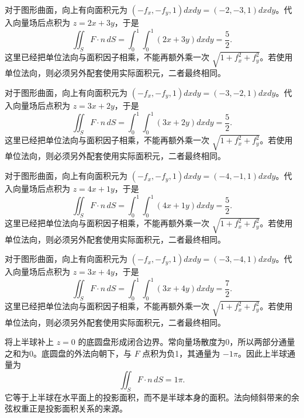 \documentclass[12pt,fontset=fandol]{ctexart}
\begin{document}
\begin{solve}\label{ans:c42q9}
对于图形曲面，向上有向面积元为 $(-f_x,-f_y,1)dxdy=(-2,-3,1)dxdy$。代入向量场后点积为 $z=2x+3y$，于是
\[
\iint_SF\cdot n\,dS=\int_0^1\int_0^1(2x+3y)dxdy=\frac{5}{2}.
\]
这里已经把单位法向与面积因子相乘，不能再额外乘一次 $\sqrt{1+f_x^2+f_y^2}$。若使用单位法向，则必须另外配套使用实际面积元，二者最终相同。
\end{solve}

\begin{solve}\label{ans:c42q10}
对于图形曲面，向上有向面积元为 $(-f_x,-f_y,1)dxdy=(-3,-2,1)dxdy$。代入向量场后点积为 $z=3x+2y$，于是
\[
\iint_SF\cdot n\,dS=\int_0^1\int_0^1(3x+2y)dxdy=\frac{5}{2}.
\]
这里已经把单位法向与面积因子相乘，不能再额外乘一次 $\sqrt{1+f_x^2+f_y^2}$。若使用单位法向，则必须另外配套使用实际面积元，二者最终相同。
\end{solve}

\begin{solve}\label{ans:c42q11}
对于图形曲面，向上有向面积元为 $(-f_x,-f_y,1)dxdy=(-4,-1,1)dxdy$。代入向量场后点积为 $z=4x+1y$，于是
\[
\iint_SF\cdot n\,dS=\int_0^1\int_0^1(4x+1y)dxdy=\frac{5}{2}.
\]
这里已经把单位法向与面积因子相乘，不能再额外乘一次 $\sqrt{1+f_x^2+f_y^2}$。若使用单位法向，则必须另外配套使用实际面积元，二者最终相同。
\end{solve}

\begin{solve}\label{ans:c42q12}
对于图形曲面，向上有向面积元为 $(-f_x,-f_y,1)dxdy=(-3,-4,1)dxdy$。代入向量场后点积为 $z=3x+4y$，于是
\[
\iint_SF\cdot n\,dS=\int_0^1\int_0^1(3x+4y)dxdy=\frac{7}{2}.
\]
这里已经把单位法向与面积因子相乘，不能再额外乘一次 $\sqrt{1+f_x^2+f_y^2}$。若使用单位法向，则必须另外配套使用实际面积元，二者最终相同。
\end{solve}

\begin{solve}\label{ans:c42q13}
将上半球补上 $z=0$ 的底圆盘形成闭合边界。常向量场散度为0，所以两部分通量之和为0。底圆盘的外法向朝下，与 $F$ 点积为负1，其通量为 $-1\pi$。因此上半球通量为
\[
\iint_SF\cdot n\,dS=1\pi.
\]
它等于上半球在水平面上的投影面积，而不是半球本身的面积。法向倾斜带来的余弦权重正是投影面积关系的来源。
\end{solve}
\end{document}
